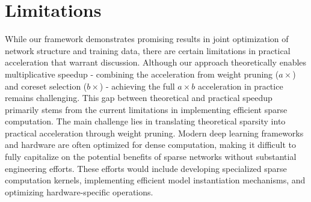 \section{Limitations}
\label{appendix:limitation}
While our framework demonstrates promising results in joint optimization of network structure and training data, there are certain limitations in practical acceleration that warrant discussion. Although our approach theoretically enables multiplicative speedup - combining the acceleration from weight pruning ($a\times$) and coreset selection ($b\times$) - achieving the full $a \times b$ acceleration in practice remains challenging. This gap between theoretical and practical speedup primarily stems from the current limitations in implementing efficient sparse computation.
The main challenge lies in translating theoretical sparsity into practical acceleration through weight pruning. Modern deep learning frameworks and hardware are often optimized for dense computation, making it difficult to fully capitalize on the potential benefits of sparse networks without substantial engineering efforts. These efforts would include developing specialized sparse computation kernels, implementing efficient model instantiation mechanisms, and optimizing hardware-specific operations.

